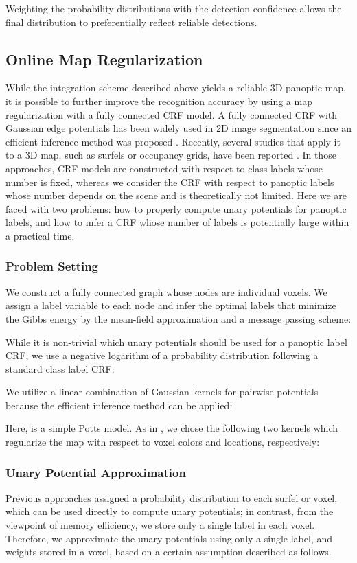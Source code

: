 \documentclass[letterpaper, 10pt, conference]{latex_template/ieeeconf}
\begin{document}
Weighting the probability distributions with the detection confidence  allows the final distribution to preferentially reflect reliable detections.


\subsection{Online Map Regularization\label{sec_map_regularization}}
While the integration scheme described above yields a reliable 3D panoptic map, it is possible to further improve the recognition accuracy by using a map regularization with a fully connected CRF model.
A fully connected CRF with Gaussian edge potentials has been widely used in 2D image segmentation since an efficient inference method was proposed \cite{krahenbuhl2011efficient}.
Recently, several studies that apply it to a 3D map, such as surfels or occupancy grids, have been reported \cite{hermans2014dense,mccormac2017semanticfusion,yang2017}.
In those approaches, CRF models are constructed with respect to class labels whose number is fixed,
whereas we consider the CRF with respect to panoptic labels whose number depends on the scene and is theoretically not limited.
Here we are faced with two problems:
how to properly compute unary potentials for panoptic labels, and how to infer a CRF whose number of labels is potentially large within a practical time.

\subsubsection{Problem Setting}
We construct a fully connected graph whose nodes are individual voxels.
We assign a label variable  to each node and infer the optimal labels  that minimize the Gibbs energy  by the mean-field approximation and a message passing scheme:

While it is non-trivial which unary potentials should be used for a panoptic label CRF, we use a negative logarithm of a probability distribution following a standard class label CRF:

We utilize a linear combination of Gaussian kernels for pairwise potentials because the efficient inference method  \cite{krahenbuhl2011efficient} can be applied:

Here,  is a simple Potts model.
As in \cite{krahenbuhl2011efficient}, we chose the following two kernels which regularize the map with respect to voxel colors and locations, respectively:


\subsubsection{Unary Potential Approximation}
Previous approaches \cite{hermans2014dense,mccormac2017semanticfusion,yang2017} assigned a probability distribution to each surfel or voxel, which can be used directly to compute unary potentials; 
in contrast, from the viewpoint of memory efficiency, we store only a single label in each voxel.
Therefore, we approximate the unary potentials using only a single label, and weights stored in a voxel, based on a certain assumption described as follows.
\end{document}
